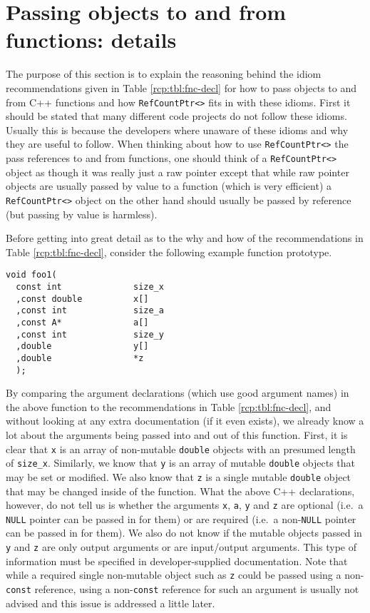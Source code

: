%
\section{Passing objects to and from functions: details}
\label{rcp:apdx:passing_args}
%

The purpose of this section is to explain the reasoning behind the
idiom recommendations given in Table {}\ref{rcp:tbl:fnc-decl} for how
to pass objects to and from C++ functions and how
{}\texttt{Ref\-Count\-Ptr<>} fits in with these idioms.  First it
should be stated that many different code projects do not follow these
idioms.  Usually this is because the developers where unaware of these
idioms and why they are useful to follow.  When thinking about how to
use {}\texttt{Ref\-Count\-Ptr<>} the pass references to and from
functions, one should think of a {}\texttt{Ref\-Count\-Ptr<>} object
as though it was really just a raw pointer except that while raw
pointer objects are usually passed by value to a function (which is
very efficient) a {}\texttt{Ref\-Count\-Ptr<>} object on the other
hand should usually be passed by reference (but passing by value is
harmless).

Before getting into great detail as to the why and how of the
recommendations in Table {}\ref{rcp:tbl:fnc-decl}, consider the
following example function prototype.
%
{\scriptsize\begin{verbatim}
void foo1(
  const int              size_x
  ,const double          x[]
  ,const int             size_a
  ,const A*              a[]
  ,const int             size_y
  ,double                y[]
  ,double                *z
  );
\end{verbatim}}
%
By comparing the argument declarations (which use good argument names)
in the above function to the recommendations in Table
{}\ref{rcp:tbl:fnc-decl}, and without looking at any extra
documentation (if it even exists), we already know a lot about the
arguments being passed into and out of this function.  First, it is
clear that {}\texttt{x} is an array of non-mutable {}\texttt{double}
objects with an presumed length of {}\texttt{size\_x}.  Similarly, we
know that {}\texttt{y} is an array of mutable {}\texttt{double}
objects that may be set or modified.  We also know that {}\texttt{z}
is a single mutable {}\texttt{double} object that may be changed
inside of the function.  What the above C++ declarations, however, do
not tell us is whether the arguments {}\texttt{x}, {}\texttt{a},
{}\texttt{y} and {}\texttt{z} are optional (i.e.~a {}\texttt{NULL}
pointer can be passed in for them) or are required (i.e.~a
non-{}\texttt{NULL} pointer can be passed in for them).  We also do
not know if the mutable objects passed in {}\texttt{y} and
{}\texttt{z} are only output arguments or are input/output arguments.
This type of information must be specified in developer-supplied
documentation.  Note that while a required single non-mutable object
such as {}\texttt{z} could be passed using a non-{}\texttt{const}
reference, using a non-{}\texttt{const} reference for such an argument
is usually not advised and this issue is addressed a little later.

